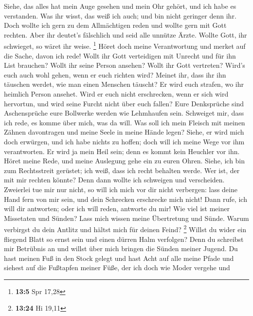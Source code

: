  Siehe, das alles hat mein Auge gesehen und mein Ohr gehört,
und ich habe es verstanden.  Was ihr wisst, das weiß ich
auch; und bin nicht geringer denn ihr.  Doch wollte ich gern
zu dem Allmächtigen reden und wollte gern mit Gott rechten. 
Aber ihr deutet's fälschlich und seid alle unnütze Ärzte. 
Wollte Gott, ihr schwieget, so wäret ihr weise. \footnote{\textbf{13:5}
  Spr 17,28}  Höret doch meine Verantwortung und merket auf
die Sache, davon ich rede!  Wollt ihr Gott verteidigen mit
Unrecht und für ihn List brauchen?  Wollt ihr seine Person
ansehen? Wollt ihr Gott vertreten?  Wird's euch auch wohl
gehen, wenn er euch richten wird? Meinet ihr, dass ihr ihn täuschen
werdet, wie man einen Menschen täuscht?  Er wird euch
strafen, wo ihr heimlich Person ansehet.  Wird er euch
nicht erschrecken, wenn er sich wird hervortun, und wird seine Furcht
nicht über euch fallen?  Eure Denksprüche sind
Aschensprüche eure Bollwerke werden wie Lehmhaufen sein. 
Schweiget mir, dass ich rede, es komme über mich, was da will.
 Was soll ich mein Fleisch mit meinen Zähnen davontragen
und meine Seele in meine Hände legen?  Siehe, er wird mich
doch erwürgen, und ich habe nichts zu hoffen; doch will ich meine Wege
vor ihm verantworten.  Er wird ja mein Heil sein; denn es
kommt kein Heuchler vor ihn.  Höret meine Rede, und meine
Auslegung gehe ein zu euren Ohren.  Siehe, ich bin zum
Rechtsstreit gerüstet; ich weiß, dass ich recht behalten werde.
 Wer ist, der mit mir rechten könnte? Denn dann wollte ich
schweigen und verscheiden.  Zweierlei tue mir nur nicht, so
will ich mich vor dir nicht verbergen:  lass deine Hand
fern von mir sein, und dein Schrecken erschrecke mich nicht!
 Dann rufe, ich will dir antworten; oder ich will reden,
antworte du mir!  Wie viel ist meiner Missetaten und
Sünden? Lass mich wissen meine Übertretung und Sünde. 
Warum verbirgst du dein Antlitz und hältst mich für deinen Feind?
\footnote{\textbf{13:24} Hi 19,11}  Willst du wider ein
fliegend Blatt so ernst sein und einen dürren Halm verfolgen?
 Denn du schreibst mir Betrübnis an und willst über mich
bringen die Sünden meiner Jugend.  Du hast meinen Fuß in
den Stock gelegt und hast Acht auf alle meine Pfade und siehest auf die
Fußtapfen meiner Füße,  der ich doch wie Moder vergehe und
